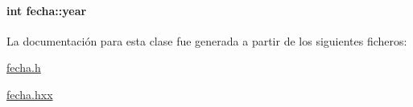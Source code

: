 \paragraph[{year}]{\setlength{\rightskip}{0pt plus 5cm}int fecha\+::year\hspace{0.3cm}{\ttfamily [private]}}\label{classfecha_a4d06534f05a6350ae229ce2b17b860e8}


La documentación para esta clase fue generada a partir de los siguientes ficheros\+:\begin{DoxyCompactItemize}
\item 
\hyperlink{fecha_8h}{fecha.\+h}\item 
\hyperlink{fecha_8hxx}{fecha.\+hxx}\end{DoxyCompactItemize}
